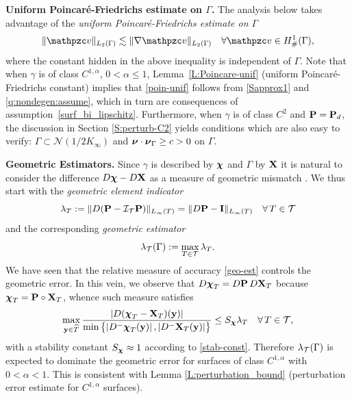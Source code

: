 \medskip\noindent
{\bf Uniform Poincar\'e-Friedrichs estimate on $\Gamma$.} %
The analysis below takes advantage of the \emph{uniform Poincar\'e-Friedrichs estimate on $\Gamma$}
%
\begin{equation} \label{poin-unif} \|\tv\|_{L_2(\Gamma)} \lesssim \|\nabla \tv\|_{L_2(\Gamma)}
\quad\forall \tv \in H^1_\#(\Gamma),
\end{equation}
where the constant hidden in the above inequality is independent of $\Gamma$.
%
Note that when $\gamma$ is of class $C^{1,\alpha}$, $0<\alpha \leq 1$, Lemma~\ref{L:Poincare-unif} (uniform Poincar\'e-Friedrichs constant) implies that \eqref{poin-unif} follows from \eqref{Sapprox1} and \eqref{q:nondegen:assume}, which in turn are consequences of assumption~\eqref{surf_bi_lipschitz}.
Furthermore, when $\gamma$ is of class $C^2$ and ${\bf P}={\bf P}_d$, the discussion in Section \ref{S:perturb-C2} yields conditions which are also  easy to verify: $\Gamma \subset \mathcal{N}(1/2K_\infty)$ and  ${\boldsymbol \nu}\cdot {\boldsymbol \nu}_\Gamma \ge c >0$ on $\Gamma$. 

 
\medskip\noindent
{\bf Geometric Estimators.} %
%
Since $\gamma$ is described by ${\boldsymbol \chi}$ and $\Gamma$ by ${\bf X}$ it is natural to
consider the difference  $D{\boldsymbol \chi}-D{\bf X}$ as a measure of geometric mismatch \cite{BCMMN16}.
We thus start with the \textit{geometric element indicator}
%
\begin{equation}%
  \lambda_T:= \| \smash { D (\bP-\interp \bP)}\|_{ L_\infty(T)} =
  \| \smash { D \bP- \bI}\|_{ L_\infty(T)}
  \quad\forall \, T\in\T
\end{equation}
%
and the corresponding \textit{geometric estimator}
%
\begin{equation}\label{geo-estimator}
\lambda_{\mathcal{T}}(\Gamma) :=\max_{ T \in \mathcal{T}} \lambda_T.
\end{equation}
%
We have seen that the relative measure of accuracy \eqref{geo-est}
controls the geometric error. In this vein, 
we observe that $D{\boldsymbol \chi}_T=D{\bf P} \, D{\bf X}_T$ because
$\boldsymbol{\mathcal{\chi}}_T = {\bf P} \circ {\bf X}_T$, whence such measure satisfies
%
\begin{equation}\label{e:approx_X}
  \max_{{\bf y}\in\widehat{T}} \frac{| D (\boldsymbol{\mathcal{\chi}}_T-{\bf X}_T)({\bf y})|}
       {\min\big\{|D^- \boldsymbol{\mathcal{\chi}}_T({\bf y})| \, , |D^- {\bf X}_T({\bf y})|\big\}}
  \leq S_{\boldsymbol \chi} \lambda_T
  \quad\forall \, T\in\mathcal{T},
\end{equation}
%
with a stability constant $S_{\boldsymbol \chi}\approx 1$ according to \eqref{stab-const}.
Therefore $\lambda_{\mathcal{T}}(\Gamma)$ is expected to dominate the geometric error
for surfaces of class $C^{1,\alpha}$ with $0<\alpha<1$. This is consistent
with Lemma \ref{L:perturbation_bound} (perturbation error estimate for $C^{1,\alpha}$
surfaces).

